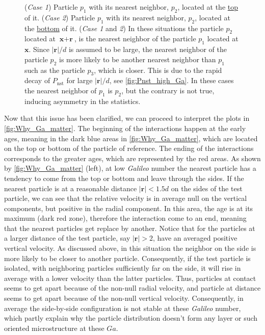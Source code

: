 \begin{figure}[h!]
{        (\textit{Case 1}) Particle $p_1$ with  its nearest neighbor, $p_2$, located at the \underline{top} of it. 
        (\textit{Case 2}) Particle $p_1$ with  its nearest neighbor, $p_2$, located at the \underline{bottom} of it. 
        (\textit{Case 1} and \textit{2})
        In these situations the particle $p_2$ located at $\textbf{x} + \textbf{r}$, is the nearest neighbor of the particle $p_1$ located at $\textbf{x}$. 
        Since $|\textbf{r}|/d$ is assumed to be large, the nearest neighbor of the particle $p_2$ is more likely to be another nearest neighbor than $p_1$ such as the particle $p_3$, which is closer.
        This is due to the rapid decay of $P_\text{nst}$ for large $|\textbf{r}|/d$, see \ref{fig:Pnst_high_Ga}. 
        In these cases the nearest neighbor of $p_1$ is $p_2$, but the contrary is not true, inducing asymmetry in the statistics.  
    }
    \label{fig:diagram_asym}
\end{figure}

Now that this issue has been clarified, we can proceed to interpret the plots in \ref{fig:Why_Ga_matter}.
The beginning of the interactions happen at the early ages, meaning in the dark blue areas in  \ref{fig:Why_Ga_matter}, which are located on the top or bottom of the particle of reference.
The ending of the interactions corresponds to the greater ages, which are represented by the red areas. 
As shown by \ref{fig:Why_Ga_matter} (left), at low \textit{Galileo} number the nearest particle has a tendency to come from the top or bottom and leave through the sides. 
If the nearest particle is at a reasonable distance $|\textbf{r}| < 1.5d$ on the sides of the test particle, we can see that the relative velocity is in average null on the vertical components, but positive in the radial component.
In this area, the age is at its maximum (dark red zone), therefore the interaction come to an end, meaning that the nearest particles get replace by another. 
Notice that for the particles at a larger distance of the test particle, say $|\textbf{r}|>2$, have an averaged positive vertical velocity. 
As discussed above, in this situation the neighbor on the side is more likely to be closer to another particle. 
Consequently, if the test particle is isolated, with neighboring particles sufficiently far on the side, it will rise in average with a lower velocity than the latter particles.
Thus, particles at contact  seems to get apart because of the non-null radial velocity, and particle at distance seems to get apart because of the non-null vertical velocity.  
Consequently, in average the side-by-side configuration is not stable at these \textit{Galileo} number, which partly explain why the particle distribution doesn't form any layer or such oriented microstructure at these $Ga$.   

